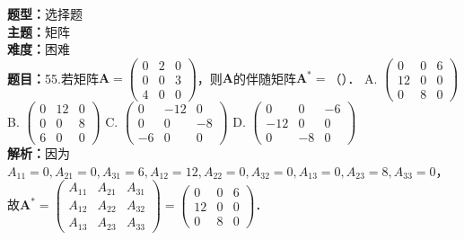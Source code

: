 \documentclass{ctexart}
\newenvironment{question}[5]{%
	\noindent\textbf{题型：}#1\\
	\textbf{主题：}#2\\
	\textbf{难度：}#3\\
	\textbf{题目：}#4\\
	\textbf{解析：}#5\\
	\vspace{1em}
}{}
\begin{document}
	\begin{question}
		{选择题}
		{矩阵}
		{困难}
		{55.若矩阵\(\mathbf{A}=\left(\begin{array}{lll}0 & 2 & 0 \\ 0 & 0 & 3 \\ 4 & 0 & 0\end{array}\right)\)，则\(\mathbf{A}\)的伴随矩阵\(\mathbf{A}^*=\)（）．
			A. \(\left(\begin{array}{ccc}0 & 0 & 6 \\ 12 & 0 & 0 \\ 0 & 8 & 0\end{array}\right)\)
			B. \(\left(\begin{array}{ccc}0 & 12 & 0 \\ 0 & 0 & 8 \\ 6 & 0 & 0\end{array}\right)\)
			C. \(\left(\begin{array}{ccc}0 & -12 & 0 \\ 0 & 0 & -8 \\ -6 & 0 & 0\end{array}\right)\)
			D. \(\left(\begin{array}{ccc}0 & 0 & -6 \\ -12 & 0 & 0 \\ 0 & -8 & 0\end{array}\right)\)}
		{因为\(A_{11}=0, A_{21}=0, A_{31}=6, A_{12}=12, A_{22}=0, A_{32}=0, A_{13}=0, A_{23}=8, A_{33}=0\)，故\(\mathbf{A}^*=\left(\begin{array}{ccc}A_{11} & A_{21} & A_{31} \\ A_{12} & A_{22} & A_{32} \\ A_{13} & A_{23} & A_{33}\end{array}\right)=\left(\begin{array}{ccc}0 & 0 & 6 \\ 12 & 0 & 0 \\ 0 & 8 & 0\end{array}\right)\)．}
	\end{question}
	
\end{document}
